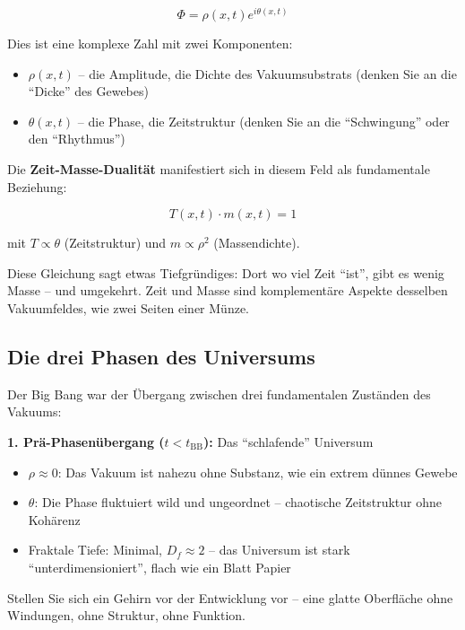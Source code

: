 \documentclass[12pt,a4paper]{article}
\begin{document}
\begin{equation}
\Phi = \rho(x,t) e^{i\theta(x,t)}
\end{equation}

Dies ist eine komplexe Zahl mit zwei Komponenten:
\begin{itemize}[leftmargin=*]
\item $\rho(x,t)$ -- die Amplitude, die Dichte des Vakuumsubstrats (denken Sie an die ``Dicke'' des Gewebes)
\item $\theta(x,t)$ -- die Phase, die Zeitstruktur (denken Sie an die ``Schwingung'' oder den ``Rhythmus'')
\end{itemize}

Die \textbf{Zeit-Masse-Dualität} manifestiert sich in diesem Feld als fundamentale Beziehung:

\begin{equation}
T(x,t) \cdot m(x,t) = 1
\end{equation}

mit $T \propto \theta$ (Zeitstruktur) und $m \propto \rho^2$ (Massendichte).

Diese Gleichung sagt etwas Tiefgründiges: Dort wo viel Zeit ``ist'', gibt es wenig Masse -- und umgekehrt. Zeit und Masse sind komplementäre Aspekte desselben Vakuumfeldes, wie zwei Seiten einer Münze.

\subsection{Die drei Phasen des Universums}

Der Big Bang war der Übergang zwischen drei fundamentalen Zuständen des Vakuums:

\textbf{1. Prä-Phasenübergang ($t < t_{\text{BB}}$):} Das ``schlafende'' Universum

\begin{itemize}[leftmargin=*]
\item $\rho \approx 0$: Das Vakuum ist nahezu ohne Substanz, wie ein extrem dünnes Gewebe
\item $\theta$: Die Phase fluktuiert wild und ungeordnet -- chaotische Zeitstruktur ohne Kohärenz
\item Fraktale Tiefe: Minimal, $D_f \approx 2$ -- das Universum ist stark ``unterdimensioniert'', flach wie ein Blatt Papier
\end{itemize}

Stellen Sie sich ein Gehirn vor der Entwicklung vor -- eine glatte Oberfläche ohne Windungen, ohne Struktur, ohne Funktion.
\end{document}
